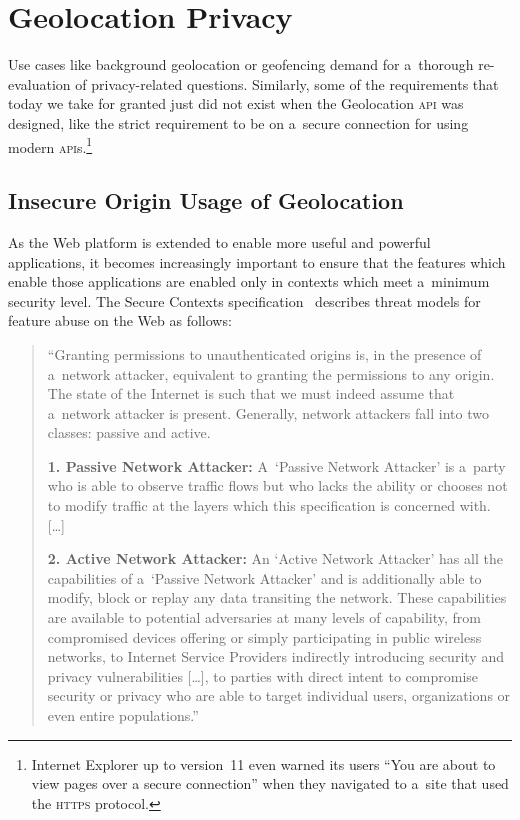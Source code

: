 \documentclass[sigconf,hyphens]{acmart}
\begin{document}
\section{Geolocation Privacy}

Use cases like background geolocation or geofencing
demand for a~thorough re-evaluation of privacy-related questions.
Similarly, some of the requirements that today we take for granted
just did not exist when the Geolocation \textsc{api} was designed,
like the strict requirement to be on a~secure connection for using modern
\textsc{api}s.\footnote{Internet Explorer up to version~11 even warned its users
``You are about to view pages over a secure connection''
when they navigated to a~site that used the \textsc{https} protocol.}

\subsection{Insecure Origin Usage of Geolocation}

As the Web platform is extended to enable more useful and powerful applications,
it becomes increasingly important to ensure that the features
which enable those applications are enabled only in contexts
which meet a~minimum security level.
The Secure Contexts specification~\cite{west2016securecontexts}
describes threat models for feature abuse on the Web as follows:

\begin{quote}
``Granting permissions to unauthenticated origins is, in the presence of a~network attacker,
equivalent to granting the permissions to any origin.
The state of the Internet is such that we must indeed assume that a~network attacker is present.
Generally, network attackers fall into two classes: passive and active.

\textbf{1. Passive Network Attacker:} A~`Passive Network Attacker' is a~party
who is able to observe traffic flows but who lacks the ability
or chooses not to modify traffic at the layers which this specification is concerned with. [\ldots]

\textbf{2. Active Network Attacker:} An `Active Network Attacker' has all the capabilities
of a~`Passive Network Attacker' and is additionally able to modify, block or replay
any data transiting the network.
These capabilities are available to potential adversaries at many levels of capability,
from compromised devices offering or simply participating in public wireless networks,
to Internet Service Providers indirectly introducing security and privacy vulnerabilities [\ldots],
to parties with direct intent to compromise security or privacy who are able to target individual
users, organizations or even entire populations.''
\end{quote}
\end{document}

